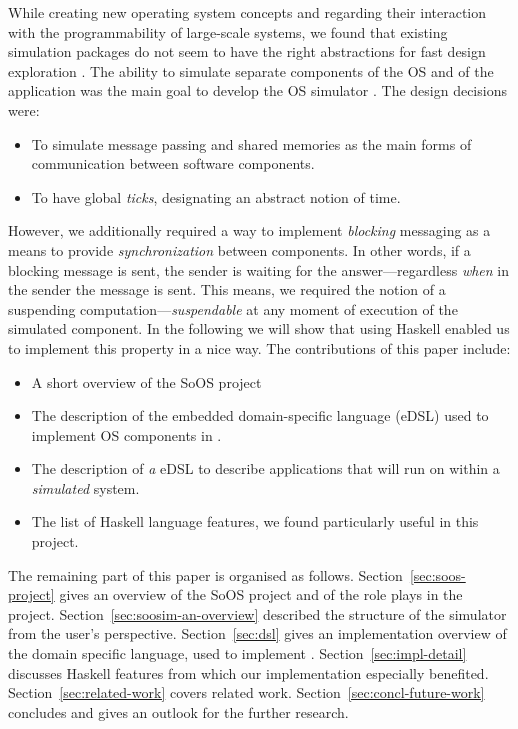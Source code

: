 While creating new operating system concepts and regarding their interaction with the programmability of large-scale systems, we found that existing simulation packages do not seem to have the right abstractions for fast design exploration \cite{cotson,omnet}.
The ability to simulate separate components of the OS and of the application was the main goal to develop the OS simulator \soosim {}.
The design decisions were:
\begin{itemize}
\item To simulate message passing and shared memories as the main forms of communication between software components.
\item To have global \emph{ticks}, designating an abstract notion of time.
\end{itemize}
However, we additionally required a way to implement \emph{blocking} messaging as a means to provide \emph{synchronization} between components.
In other words, if a blocking message is sent, the sender is waiting for the answer---regardless \emph{when} in the sender the message is sent.
This means, we required the notion of a suspending computation---\emph{suspendable} at any moment of execution of the simulated component.
In the following we will show that using Haskell \cite{haskell-report} enabled us to implement this property in a nice way.
The contributions of this paper include:
\begin{itemize}
\item A short overview of the SoOS project
\item The description of the embedded domain-specific language (eDSL) used to implement OS components in \soosim.
\item The description of \emph{a} eDSL to describe applications that will run on within a \soosim \emph{simulated} system.
\item The list of Haskell language features, we found particularly useful in this project.
\end{itemize}

The remaining part of this paper is organised as follows.
Section~\ref{sec:soos-project} gives an overview of the SoOS project and of the role \soosim plays in the project.
Section~\ref{sec:soosim-an-overview} described the structure of the \soosim simulator from the user's perspective.
Section~\ref{sec:dsl} gives an implementation overview of the domain specific language, used to implement \soosim.
Section~\ref{sec:impl-detail} discusses Haskell features from which our implementation especially benefited.
Section~\ref{sec:related-work} covers related work.
Section~\ref{sec:concl-future-work} concludes and gives an outlook for the further research.

